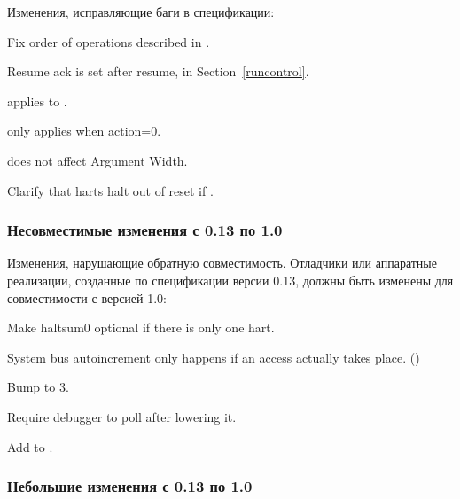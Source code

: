 \begin{steps}{Изменения, исправляющие баги в спецификации:}
    \item Fix order of operations described in \RdmSbdataZero. 
    \item Resume ack is set after resume, in Section~\ref{runcontrol}. 
    \item \FcsrTextraThirtytwoSselect applies to \FcsrTextraThirtytwoSvalue. 
    \item \FcsrTcontrolMte only applies when action=0. 
    \item \FacAccessmemoryAamsize does not affect Argument Width. 
    \item Clarify that harts halt out of reset if . 
\end{steps}

\subsubsection{Несовместимые изменения с 0.13 по 1.0}

\begin{steps}{Изменения, нарушающие обратную совместимость. Отладчики или
аппаратные реализации, созданные по спецификации версии 0.13, должны быть изменены для
совместимости с версией 1.0:}
    \item Make haltsum0 optional if there is only one hart. 
    \item System bus autoincrement only happens if an access actually
    takes place. (\RdmSbdataZero) 
    \item Bump \FdmDmstatusVersion to 3. 
    \item Require debugger to poll \FdmDmcontrolDmactive after lowering it. 
    \item Add \FcsrIcountPending to \RcsrIcount. 
\end{steps}

\subsubsection{Небольшие изменения с 0.13 по 1.0}

